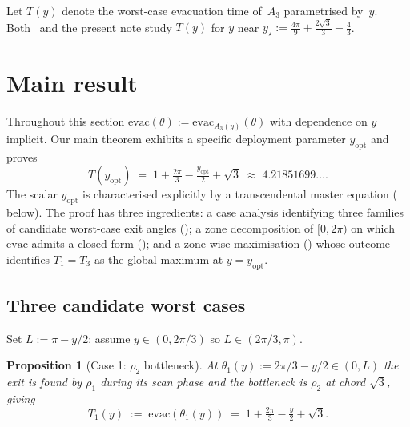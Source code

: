 \documentclass[11pt]{article}
\theoremstyle{plain}
\newtheorem{proposition}[theorem]{Proposition}
\theoremstyle{definition}
\theoremstyle{remark}
\begin{document}
Let $T(y)$ denote the worst-case evacuation time of~$A_3$ parametrised by~$y$.
Both~\cite{czyzowicz2014} and the present note study
$T(y)$ for $y$ near $y_\star := \tfrac{4\pi}{9} + \tfrac{2\sqrt3}{3} - \tfrac{4}{3}$.

\section{Main result}
\label{sec:main}

Throughout this section $\mathrm{evac}(\theta) :=
\mathrm{evac}_{A_3(y)}(\theta)$ with dependence on $y$ implicit. Our
main theorem exhibits a specific deployment parameter
$y_{\mathrm{opt}}$ and proves
\[
T(y_{\mathrm{opt}}) \;=\; 1 + \tfrac{2\pi}{3} - \tfrac{y_{\mathrm{opt}}}{2}
+ \sqrt 3 \;\approx\; 4.21851699\ldots.
\]
The scalar $y_{\mathrm{opt}}$ is characterised explicitly by a
transcendental master equation ( below). The
proof has three ingredients: a case analysis identifying three families
of candidate worst-case exit angles
(); a zone decomposition of
$[0, 2\pi)$ on which $\mathrm{evac}$ admits a closed form
(); and a zone-wise maximisation
() whose outcome identifies $T_1 = T_3$ as the
global maximum at $y = y_{\mathrm{opt}}$.

\subsection{Three candidate worst cases}

Set $L := \pi - y/2$; assume $y \in (0, 2\pi/3)$ so $L \in (2\pi/3, \pi)$.

\begin{proposition}[Case 1: $\rho_2$ bottleneck]
\label{prop:case1}
At $\theta_1(y) := 2\pi/3 - y/2 \in (0, L)$ the exit is found by $\rho_1$
during its scan phase and the bottleneck is $\rho_2$ at chord $\sqrt 3$,
giving
\begin{equation}
\label{eq:T1}
T_1(y) \;:=\; \mathrm{evac}(\theta_1(y))
\;=\; 1 + \tfrac{2\pi}{3} - \tfrac{y}{2} + \sqrt 3.
\end{equation}
\end{proposition}
\end{document}
